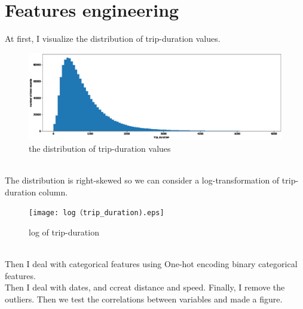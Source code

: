 \section{Features engineering} \label{sec-Features engineering}


At first, I visualize the distribution of trip-duration values.
\begin{figure}[h]
	\centering
	\includegraphics[scale=0.3]{trip_duration.eps}
	\caption{the distribution of trip-duration values}
\end{figure}
\\
The distribution is right-skewed so we can consider a log-transformation of trip-duration column.
\begin{figure}[h]
	\centering
	\texttt{[image: log（trip\_duration).eps]}
	\caption{log of trip-duration}
\end{figure}
\\
Then I deal with categorical features using One-hot encoding binary categorical features.  
\\
Then I deal with dates, and ccreat distance and speed. Finally, I remove the outliers. Then we test the correlations between variables and made a figure.
